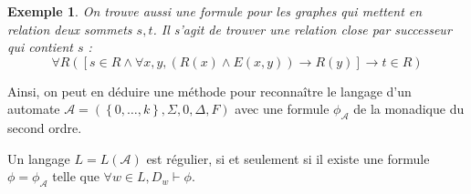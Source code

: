 \documentclass{cours}
\newtheorem{example}{Exemple}[section]
\begin{document}
\begin{example}
    On trouve aussi une formule pour les graphes qui mettent en relation deux sommets $s, t$. Il s'agit de trouver une relation close par successeur qui contient $s$ : 
    \[
        \forall R \left(\left[s \in R \land \forall x, y, \left(R(x) \land E(x, y)\right) \rightarrow R(y)\right] \rightarrow t \in R\right)    
    \]
\end{example}

Ainsi, on peut en déduire une méthode pour reconnaître le langage d'un automate $\mathcal{A} = \left(\left\{0, \ldots, k\right\}, \Sigma, 0, \Delta, F\right)$ avec une formule $\phi_{\mathcal{A}}$ de la monadique du second ordre.

\begin{theorem}
    Un langage $L = L(\mathcal{A})$ est régulier, si et seulement si il existe une formule $\phi = \phi_{\mathcal{A}}$ telle que $\forall w \in L, D_{w} \vdash \phi$.
\end{theorem}
\end{document}
